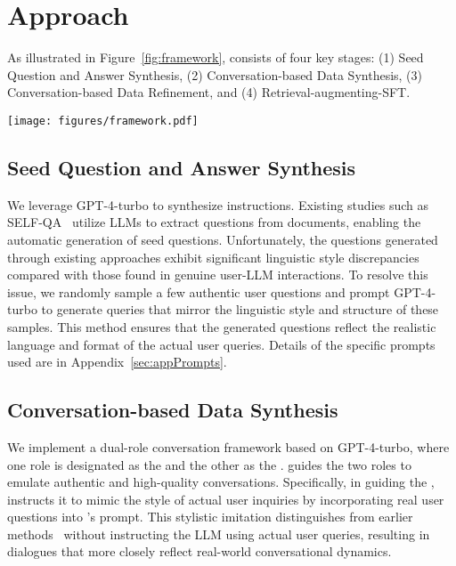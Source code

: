\section{Approach}
As illustrated in Figure~\ref{fig:framework}, \ourmodel consists of four key stages: (1) Seed Question and Answer Synthesis, (2) Conversation-based Data Synthesis, (3) Conversation-based Data Refinement, and (4) Retrieval-augmenting-SFT.

\begin{figure*}[htbp]
\centering
\texttt{[image: figures/framework.pdf]}
    \caption{The framework of \ourmodel}
    \label{fig:framework}
\end{figure*}

\subsection{Seed Question and Answer Synthesis}
We leverage GPT-4-turbo to synthesize instructions. Existing studies such as SELF-QA~\cite{zhang2023self} utilize LLMs to extract questions from documents, enabling the automatic generation of seed questions. Unfortunately, the questions generated through existing approaches exhibit significant linguistic style discrepancies compared with those found in genuine user-LLM interactions. To resolve this issue, we randomly sample a few authentic user questions and prompt GPT-4-turbo to generate queries that mirror the linguistic style and structure of these samples. This method ensures that the generated questions reflect the realistic language and format of the actual user queries. Details of the specific prompts used are in Appendix~\ref{sec:appPrompts}.

\subsection{Conversation-based Data Synthesis}
We implement a dual-role conversation framework based on GPT-4-turbo, where one role is designated as the \Inquirer and the other as the \Assistant. \ourmodel guides the two roles to emulate authentic and high-quality conversations. Specifically, in guiding the \Inquirer, \ourmodel instructs it to mimic the style of actual user inquiries by incorporating real user questions into \Inquirer's prompt. This stylistic imitation distinguishes from earlier methods~\cite{Wang2022SelfInstructAL} without instructing the LLM using actual user queries, resulting in dialogues that more closely reflect real-world conversational dynamics.

